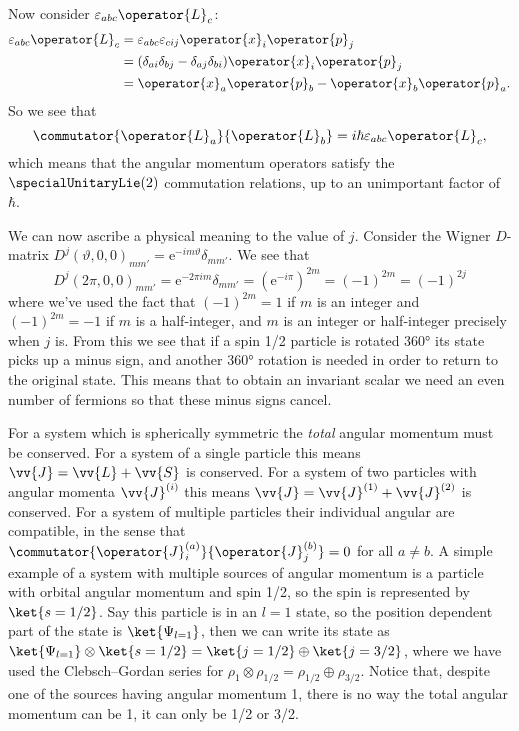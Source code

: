 \documentclass[fleqn]{NotesClass}
\newcommand*{\directsum}{\oplus}
\newcommand*{\directproduct}{\otimes}
\newcommand*{\e}{\mathrm{e}}
\begin{document}
    Now consider \(\varepsilon_{abc}\operator{L}_c\):
    \begin{align}
        \varepsilon_{abc}\operator{L}_c &= \varepsilon_{abc}\varepsilon_{cij}\operator{x}_i\operator{p}_j\\
        &= (\delta_{ai}\delta_{bj} - \delta_{aj}\delta_{bi})\operator{x}_i\operator{p}_j\\
        &= \operator{x}_a\operator{p}_b - \operator{x}_b\operator{p}_a.
    \end{align}
    So we see that
    \begin{equation}
        \commutator{\operator{L}_a}{\operator{L}_b} = i\hbar\varepsilon_{abc}\operator{L}_c,
    \end{equation}
    which means that the angular momentum operators satisfy the \(\specialUnitaryLie(2)\) commutation relations, up to an unimportant factor of \(\hbar\).
    
    We can now ascribe a physical meaning to the value of \(j\).
    Consider the Wigner \(D\)-matrix \(D^j(\vartheta, 0, 0)_{mm'} = \e^{-im\vartheta}\delta_{mm'}\).
    We see that
    \begin{equation}
        D^j(2\pi, 0, 0)_{mm'} = \e^{-2\pi i m}\delta_{mm'} = (\e^{-i\pi})^{2m} = (-1)^{2m} = (-1)^{2j}
    \end{equation}
    where we've used the fact that \((-1)^{2m} = 1\) if \(m\) is an integer and \((-1)^{2m} = -1\) if \(m\) is a half-integer, and \(m\) is an integer or half-integer precisely when \(j\) is.
    From this we see that if a spin 1/2 particle is rotated \ang{360} its state picks up a minus sign, and another \ang{360} rotation is needed in order to return to the original state.
    This means that to obtain an invariant scalar we need an even number of fermions so that these minus signs cancel.
    
    For a system which is spherically symmetric the \emph{total} angular momentum must be conserved.
    For a system of a single particle this means \(\vv{J} = \vv{L} + \vv{S}\) is conserved.
    For a system of two particles with angular momenta \(\vv{J}^{(i)}\) this means \(\vv{J} = \vv{J}^{(1)} + \vv{J}^{(2)}\) is conserved.
    For a system of multiple particles their individual angular are compatible, in the sense that \(\commutator{\operator{J}_i^{(a)}}{\operator{J}_j^{(b)}} = 0\) for all \(a \ne b\).
    A simple example of a system with multiple sources of angular momentum is a particle with orbital angular momentum and spin 1/2, so the spin is represented by \(\ket{s = 1/2}\).
    Say this particle is in an \(l = 1\) state, so the position dependent part of the state is \(\ket{\Psi_{l=1}}\), then we can write its state as \(\ket{\Psi_{l=1}} \directproduct \ket{s = 1/2} = \ket{j = 1/2} \directsum \ket{j = 3/2}\), where we have used the Clebsch--Gordan series for \(\rho_{1} \directproduct \rho_{1/2} = \rho_{1/2} \directsum \rho_{3/2}\).
    Notice that, despite one of the sources having angular momentum 1, there is no way the total angular momentum can be 1, it can only be 1/2 or 3/2.
    
\end{document}
